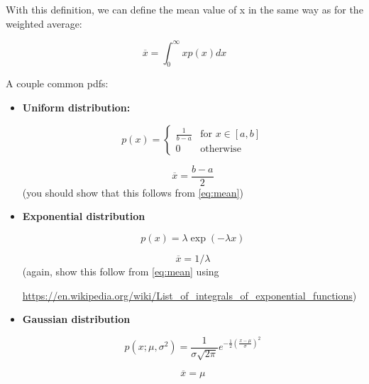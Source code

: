 \documentclass[12pt]{article}
\begin{document}
With this definition, we can define the mean value of x in the same way as for the weighted average:

\begin{equation}
  \label{eq:mean}
  \overline{x} = \int_0^\infty x p(x) dx
\end{equation}

A couple common pdfs:

\begin{itemize}

\item \textbf{Uniform distribution:}


\begin{equation}
p(x) = 
  \begin{cases}
                  \frac{1}{b - a} & \text{for } x \in [a,b]  \\
                  0               & \text{otherwise}
\end{cases}
\end{equation}

\begin{equation}
  \label{eq:unif}
  \overline{x} = \frac{b-a}{2}
\end{equation}
(you should show that this follows from \eqref{eq:mean})


\item \textbf{Exponential distribution}

  \begin{equation}
    \label{eq:expon}
    p(x) = \lambda \exp ( -\lambda x)
  \end{equation}

  \begin{equation}
    \label{eq:exmean}
    \overline{x} = 1/\lambda
  \end{equation}
(again, show this follow from \eqref{eq:mean} using 

\href{https://en.wikipedia.org/wiki/List_of_integrals_of_exponential_functions}%
{\url{https://en.wikipedia.org/wiki/List_of_integrals_of_exponential_functions}})

\item \textbf{Gaussian distribution}

\begin{equation}
  \label{eq:gaussian}
   p(x;\mu,\sigma^2) = \frac{1}{\sigma\sqrt{2\pi}} e^{ -\frac{1}{2}\left(\frac{x-\mu}{\sigma}\right)^2 }
\end{equation}

\begin{equation}
\overline{x} = \mu
  \label{eq:gaussmean}
\end{equation}

\end{itemize}
\end{document}
